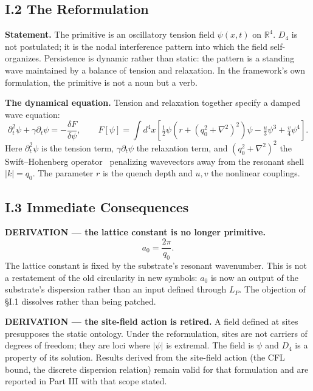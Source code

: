\documentclass[11pt,a4paper]{article}
\begin{document}
\subsection{I.2 The Reformulation}
\textbf{Statement.} The primitive is an oscillatory tension field $\psi(x, t)$ on $\mathbb{R}^4$. $D_4$ is not postulated; it is the nodal interference pattern into which the field self-organizes. Persistence is dynamic rather than static: the pattern is a standing wave maintained by a balance of tension and relaxation. In the framework's own formulation, the primitive is not a noun but a verb.

\textbf{The dynamical equation.} Tension and relaxation together specify a damped wave equation:
\begin{equation}
\partial_t^2 \psi + \gamma \partial_t \psi = -\frac{\delta F}{\delta \psi},
\qquad
F[\psi] = \int d^4x \left[ \tfrac{1}{2}\psi\left(r + (q_0^2 + \nabla^2)^2\right)\psi - \tfrac{u}{3}\psi^3 + \tfrac{v}{4}\psi^4 \right].
\end{equation}
Here $\partial_t^2\psi$ is the tension term, $\gamma\partial_t\psi$ the relaxation term, and $(q_0^2 + \nabla^2)^2$ the Swift--Hohenberg operator~\cite{swift1977} penalizing wavevectors away from the resonant shell $|k| = q_0$. The parameter $r$ is the quench depth and $u, v$ the nonlinear couplings.

\subsection{I.3 Immediate Consequences}
\textbf{DERIVATION --- the lattice constant is no longer primitive.}
\begin{equation}
a_0 = \frac{2\pi}{q_0}.
\end{equation}
The lattice constant is fixed by the substrate's resonant wavenumber. This is not a restatement of the old circularity in new symbols: $a_0$ is now an output of the substrate's dispersion rather than an input defined through $L_P$. The objection of \S I.1 dissolves rather than being patched.

\textbf{DERIVATION --- the site-field action is retired.} A field defined at sites presupposes the static ontology. Under the reformulation, sites are not carriers of degrees of freedom; they are loci where $|\psi|$ is extremal. The field is $\psi$ and $D_4$ is a property of its solution. Results derived from the site-field action (the CFL bound, the discrete dispersion relation) remain valid for that formulation and are reported in Part III with that scope stated.
\end{document}
